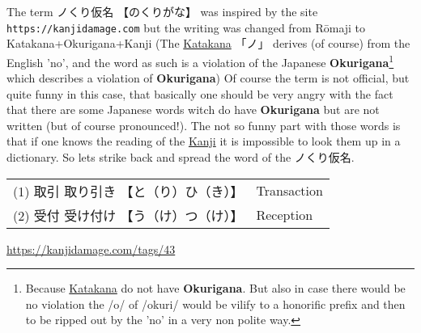 The term {ノくり仮名} {【のくりがな】} was inspired by the site
\texttt{https://kanjidamage.com} but the writing was changed from Rōmaji to
Katakana+Okurigana+Kanji (The \hyperref[sec:Katakana]{Katakana} {「ノ」}
derives (of course) from the English 'no', and the word as such is a violation
of the Japanese \textbf{Okurigana}\footnote{Because
\hyperref[sec:Katakana]{Katakana} do not have \textbf{Okurigana}. But also in
case there would be no violation the /o/ of /okuri/ would be vilify to a
honorific prefix and then to be ripped out by the 'no' in a very non polite
way.} which describes a violation of \textbf{Okurigana}) Of course the term  is
not official, but quite funny in this case, that basically one should be very
angry with the fact that there are some Japanese words witch do have
\textbf{Okurigana} but are not written (but of course pronounced!).  The not so
funny part with those words is that if one knows the reading of the
\hyperref[sec:Kanji]{Kanji} it is impossible to look them up in a dictionary.
So lets strike back and spread the word of the ノくり仮名.

\begin{center}\begin{tabular}{ll}
(1) {取引} {取り引き} {【と（り）ひ（き）】} &  Transaction\\
(2) {受付} {受け付け} {【う（け）つ（け）】} &  Reception\\
\end{tabular}\end{center}


\Link \href{https://kanjidamage.com/tags/43}{https://kanjidamage.com/tags/43}








